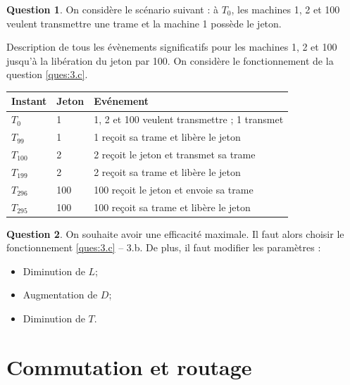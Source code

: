 \documentclass[11pt,english,french]{scrreprt}
\theoremstyle{remark}
\theoremstyle{definition}
\newtheorem{ques}{Question}[section]
\begin{document}
\begin{ques}
	On considère le scénario suivant : à $T_0$, les machines 1, 2 et 100 veulent transmettre une trame et la machine 1 possède le jeton.
	
	Description de tous les évènements significatifs pour les machines 1, 2 et 100 jusqu'à la libération du jeton par 100. On considère le fonctionnement de la question \ref{ques:3.c}.
	
	\begin{tabularx}{\textwidth}{llX}
		\toprule 
		Instant & Jeton & Evénement\tabularnewline
		\midrule
		\midrule
		$T_0$ & 1 & 1, 2 et 100 veulent transmettre ; 1 transmet\tabularnewline
		\midrule 
		$T_{99}$ & 1 & 1 reçoit sa trame et libère le jeton\tabularnewline
		\midrule 
		$T_{100}$ & 2 & 2 reçoit le jeton et transmet sa trame\tabularnewline
		\midrule 
		$T_{199}$ & 2 & 2 reçoit sa trame et libère le jeton\tabularnewline
		\midrule 
		$T_{296}$ & 100 & 100 reçoit le jeton et envoie sa trame\tabularnewline
		\midrule 
		$T_{295}$ & 100 & 100 reçoit sa trame et libère le jeton\tabularnewline
		\bottomrule
	\end{tabularx}
\end{ques}

\begin{ques}
	On souhaite avoir une efficacité maximale. Il faut alors choisir le fonctionnement \ref{ques:3.c} -- 3.b. De plus, il faut modifier les paramètres :\begin{itemize}
		\item Diminution de $L$;
		\item Augmentation de $D$;
		\item Diminution de $T$.
	\end{itemize}
\end{ques}

\section{Commutation et routage} %
\end{document}
